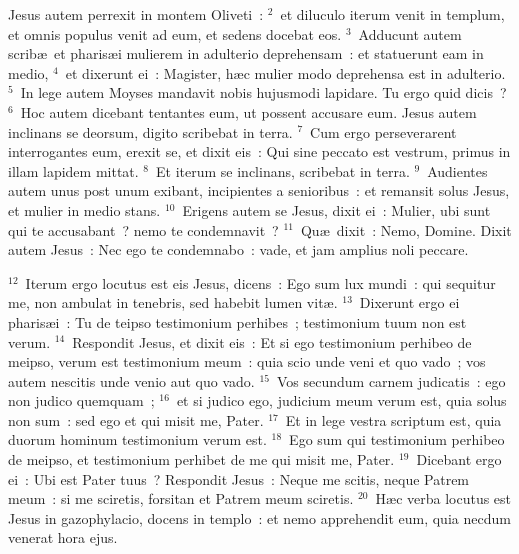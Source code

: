 \lettrine[lines=10,image=true,loversize=0.05,lraise=-0.03]{J}{}esus autem perrexit in montem Oliveti~:
${}^{2}$~et diluculo iterum venit in templum, et omnis populus venit ad eum, et sedens docebat eos.
${}^{3}$~Adducunt autem scrib\ae\ et pharis\ae i mulierem in adulterio deprehensam~: et statuerunt eam in medio,
${}^{4}$~et dixerunt ei~: Magister, h\ae c mulier modo deprehensa est in adulterio.
${}^{5}$~In lege autem Moyses mandavit nobis hujusmodi lapidare. Tu ergo quid dicis~?
${}^{6}$~Hoc autem dicebant tentantes eum, ut possent accusare eum. Jesus autem inclinans se deorsum, digito scribebat in terra.
${}^{7}$~Cum ergo perseverarent interrogantes eum, erexit se, et dixit eis~: Qui sine peccato est vestrum, primus in illam lapidem mittat.
${}^{8}$~Et iterum se inclinans, scribebat in terra.
${}^{9}$~Audientes autem unus post unum exibant, incipientes a senioribus~: et remansit solus Jesus, et mulier in medio stans.
${}^{10}$~Erigens autem se Jesus, dixit ei~: Mulier, ubi sunt qui te accusabant~? nemo te condemnavit~?
${}^{11}$~Qu\ae\ dixit~: Nemo, Domine. Dixit autem Jesus~: Nec ego te condemnabo~: vade, et jam amplius noli peccare.


${}^{12}$~Iterum ergo locutus est eis Jesus, dicens~: Ego sum lux mundi~: qui sequitur me, non ambulat in tenebris, sed habebit lumen vit\ae .
${}^{13}$~Dixerunt ergo ei pharis\ae i~: Tu de teipso testimonium perhibes~; testimonium tuum non est verum.
${}^{14}$~Respondit Jesus, et dixit eis~: Et si ego testimonium perhibeo de meipso, verum est testimonium meum~: quia scio unde veni et quo vado~; vos autem nescitis unde venio aut quo vado.
${}^{15}$~Vos secundum carnem judicatis~: ego non judico quemquam~;
${}^{16}$~et si judico ego, judicium meum verum est, quia solus non sum~: sed ego et qui misit me, Pater.
${}^{17}$~Et in lege vestra scriptum est, quia duorum hominum testimonium verum est.
${}^{18}$~Ego sum qui testimonium perhibeo de meipso, et testimonium perhibet de me qui misit me, Pater.
${}^{19}$~Dicebant ergo ei~: Ubi est Pater tuus~? Respondit Jesus~: Neque me scitis, neque Patrem meum~: si me sciretis, forsitan et Patrem meum sciretis.
${}^{20}$~H\ae c verba locutus est Jesus in gazophylacio, docens in templo~: et nemo apprehendit eum, quia necdum venerat hora ejus.



